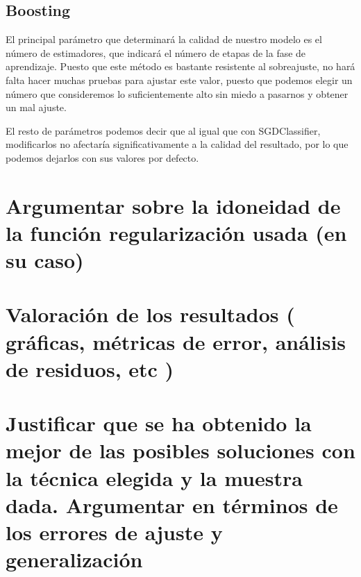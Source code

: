 \documentclass{article}
\begin{document}
	\subsection{Boosting}
	El principal parámetro que determinará la calidad de nuestro modelo es el número de estimadores, que indicará el número de etapas de la fase de aprendizaje. Puesto que este método es bastante resistente al sobreajuste, no hará falta hacer muchas pruebas para ajustar este valor, puesto que podemos elegir un número que consideremos lo suficientemente alto sin miedo a pasarnos y obtener un mal ajuste.
	\par 
	 El resto de parámetros podemos decir que al igual que con SGDClassifier, modificarlos no afectaría significativamente a la calidad del resultado, por lo que podemos dejarlos con sus valores por defecto.
	
	\section{Argumentar sobre la idoneidad de la función regularización usada (en su caso)} %
	
	
	
	\section{Valoración de los resultados ( gráficas, métricas de error, análisis de residuos, etc )} %
	
	
	
	\section{Justificar que se ha obtenido la mejor de las posibles soluciones con la técnica elegida y la muestra dada. Argumentar en términos de los errores de ajuste y generalización} %
	
	
	
\end{document}
